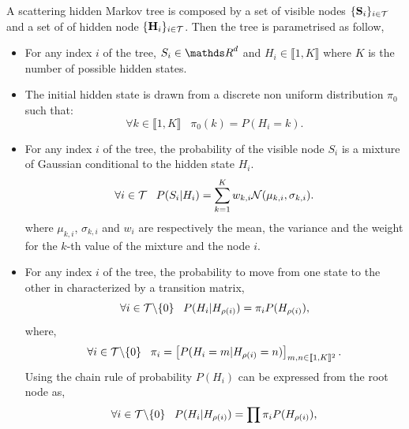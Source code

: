 \documentclass[a4paper,11pt]{report}
\begin{document}
{	  A scattering hidden Markov tree is composed by a set of visible nodes $\{{\bf S}_{i}\}_{i \in \mathcal{T}}$ and a set of of hidden node $\{{\bf H}_{i}\}_{i \in \mathcal{T}}$. Then the tree is parametrised as follow,
	  
    \begin{itemize}
      \item For any index $i$ of the tree, $S_{i} \in \dsR^{d}$ and $H_{i} \in \llbracket 1,K \rrbracket$ where $K$ is the number of possible hidden states.
      \item The initial hidden state is drawn from a discrete non uniform distribution $\pi_{0}$ such that:
	  	  \begin{equation}
					\forall k \in \llbracket 1,K \rrbracket \;\;\; \pi_{0}(k) = P(H_{i}=k).
					\label{eq:SCHMT - initial distribution}
				\end{equation}
      \item For any index $i$ of the tree, the probability of the visible node $S_{i}$ is a mixture of Gaussian conditional to the hidden state $H_{i}$. 
				\begin{equation}
				  \forall i \in \mathcal{T} \;\;\; P(S_{i} | H_{i}) = \sum_{k=1}^{K} w_{k,i} \mathcal{N}(\mu_{k,i},\sigma_{k,i}).
				  \label{eq:SCHMT - Mixt of Gaussian}
				\end{equation}
				where $\mu_{k,i}$, $\sigma_{k,i}$ and $w_{i}$ are respectively the mean, the variance and the weight for the $k$-th value of the mixture and the node $i$.
			\item For any index $i$ of the tree, the probability to move from one state to the other in characterized by a transition matrix,
				\begin{equation}
				  \forall i \in \mathcal{T} \backslash\{0\} \;\;\; P(H_{i} | H_{\rho(i)}) = \pi_{i} P(H_{\rho(i)}),
				  \label{eq:SCHMT - Transition proba}
				\end{equation}
				where,
				\begin{equation}
						\forall i \in \mcalT \backslash \{ 0 \} \;\;\; \pi_{i} = \left[P(H_{i}= m | H_{\rho(i)}=n) \right]_{m,n \in \llbracket 1,K \rrbracket^{2}}. %
						\label{eq:SCHMT - Transition matrix}
				\end{equation}
				Using the chain rule of probability $P(H_{i})$ can be expressed from the root node as,
				\begin{equation}
				  \forall i \in \mathcal{T} \backslash\{0\} \;\;\; P(H_{i} | H_{\rho(i)}) = \prod_{}\pi_{i} P(H_{\rho(i)}),
				  \label{eq:SCHMT - Transition proba}
				\end{equation}
			

\end{itemize}}
\end{document}
